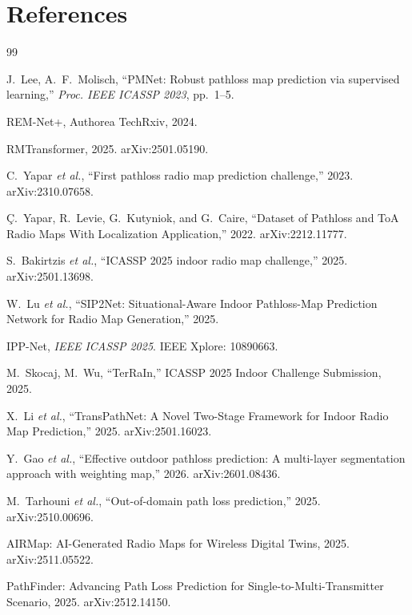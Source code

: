 \documentclass[11pt,a4paper]{article}
\begin{document}
\section*{References}
\label{sec:references}

\begin{thebibliography}{99}

J.~Lee, A.~F.~Molisch,
``PMNet: Robust pathloss map prediction via supervised learning,''
\textit{Proc. IEEE ICASSP 2023}, pp.~1--5.

REM-Net+, Authorea TechRxiv, 2024.

RMTransformer, 2025. arXiv:2501.05190.

C.~Yapar \textit{et al.},
``First pathloss radio map prediction challenge,''
2023. arXiv:2310.07658.

Ç.~Yapar, R.~Levie, G.~Kutyniok, and G.~Caire,
``Dataset of Pathloss and ToA Radio Maps With Localization Application,''
2022. arXiv:2212.11777.

S.~Bakirtzis \textit{et al.},
``ICASSP 2025 indoor radio map challenge,''
2025. arXiv:2501.13698.

W.~Lu \textit{et al.},
``SIP2Net: Situational-Aware Indoor Pathloss-Map Prediction Network for Radio Map Generation,''
2025.

IPP-Net, \textit{IEEE ICASSP 2025}. IEEE Xplore: 10890663.

M.~Skocaj, M.~Wu,
``TerRaIn,'' ICASSP 2025 Indoor Challenge Submission, 
2025.

X.~Li \textit{et al.},
``TransPathNet: A Novel Two-Stage Framework for Indoor Radio Map Prediction,'' 
2025. arXiv:2501.16023.

Y.~Gao \textit{et al.},
``Effective outdoor pathloss prediction: A multi-layer segmentation approach
with weighting map,''
2026. arXiv:2601.08436.

M.~Tarhouni \textit{et al.},
``Out-of-domain path loss prediction,''
2025. arXiv:2510.00696.

AIRMap: AI-Generated Radio Maps for Wireless Digital Twins,
2025. arXiv:2511.05522.

PathFinder: Advancing Path Loss Prediction for Single-to-Multi-Transmitter Scenario,
2025. arXiv:2512.14150.


\end{thebibliography}
\end{document}
